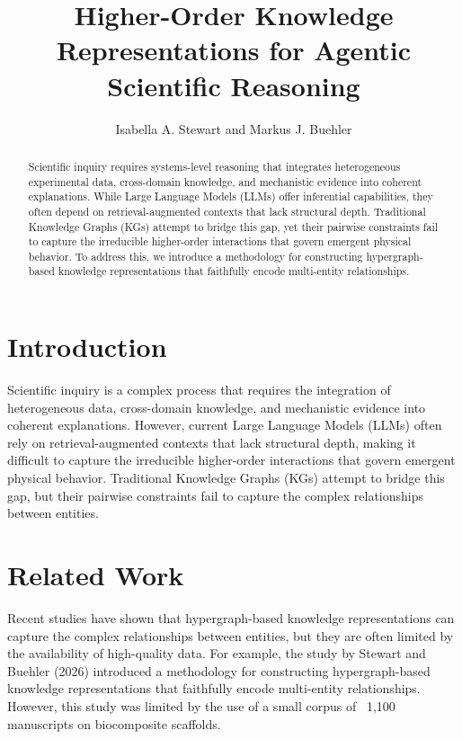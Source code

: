 \documentclass[12pt, a4paper]{article}
\begin{document}
\title{Higher-Order Knowledge Representations for Agentic Scientific Reasoning}

\author{Isabella A. Stewart and Markus J. Buehler}

\maketitle

\begin{abstract}
Scientific inquiry requires systems-level reasoning that integrates heterogeneous experimental data, cross-domain knowledge, and mechanistic evidence into coherent explanations. While Large Language Models (LLMs) offer inferential capabilities, they often depend on retrieval-augmented contexts that lack structural depth. Traditional Knowledge Graphs (KGs) attempt to bridge this gap, yet their pairwise constraints fail to capture the irreducible higher-order interactions that govern emergent physical behavior. To address this, we introduce a methodology for constructing hypergraph-based knowledge representations that faithfully encode multi-entity relationships.
\end{abstract}

\section{Introduction}

Scientific inquiry is a complex process that requires the integration of heterogeneous data, cross-domain knowledge, and mechanistic evidence into coherent explanations. However, current Large Language Models (LLMs) often rely on retrieval-augmented contexts that lack structural depth, making it difficult to capture the irreducible higher-order interactions that govern emergent physical behavior. Traditional Knowledge Graphs (KGs) attempt to bridge this gap, but their pairwise constraints fail to capture the complex relationships between entities.

\section{Related Work}

Recent studies have shown that hypergraph-based knowledge representations can capture the complex relationships between entities, but they are often limited by the availability of high-quality data. For example, the study by Stewart and Buehler (2026) introduced a methodology for constructing hypergraph-based knowledge representations that faithfully encode multi-entity relationships. However, this study was limited by the use of a small corpus of ~1,100 manuscripts on biocomposite scaffolds.
\end{document}
